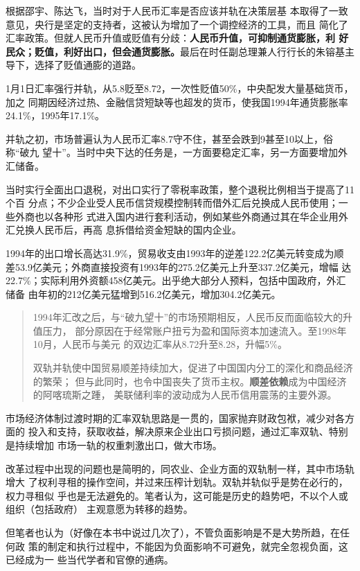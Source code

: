 根据邵宇、陈达飞\cite{huilv70binggui}，当时对于人民币汇率是否应该并轨在决策层基
本取得了一致意见，央行是坚定的支持者，这被认为增加了一个调控经济的工具，而且
简化了汇率政策。但就人民币升值或贬值有分歧：\textbf{人民币升值，可抑制通货膨胀，利
  好民众；贬值，利好出口，但会通货膨胀。}最后在时任副总理兼人行行长的朱镕基主
导下，选择了贬值通膨的道路。

1月1日汇率强行并轨，从5.8贬至8.72，一次性贬值50\%，中央配发大量基础货币，加之
同期因经济过热、金融信贷短缺等也超发的货币，使我国1994年通货膨胀率24.1\%，1995年17.1\%。

并轨之初，市场普遍认为人民币汇率8.7守不住，甚至会跌到9甚至10以上，俗称“破九
望十”。当时中央下达的任务是，一方面要稳定汇率，另一方面要增加外汇储备。

当时实行全面出口退税，对出口实行了零税率政策，整个退税比例相当于提高了11个百
分点；不少企业受人民币信贷规模控制转而借外汇后兑换成人民币使用；一些外商也以各种形
式进入国内进行套利活动，例如某些外商通过其在华企业用外汇兑换人民币后，再高
息拆借给资金短缺的国内企业。

1994年的出口增长高达31.9\%，贸易收支由1993年的逆差122.2亿美元转变成为顺
差53.9亿美元；外商直接投资有1993年的275.2亿美元上升至337.2亿美元，增幅
达22.7\%；实际利用外资额458亿美元。出乎绝大部分人预料，包括中国政府，外汇储备
由年初的212亿美元猛增到516.2亿美元，增加304.2亿美元。

\begin{quotation}
  1994年汇改之后，与“破九望十”的市场预期相反，人民币反而面临较大的升值压力，
  部分原因在于经常账户扭亏为盈和国际资本加速流入。至1998年10月，人民币与美元
  的双边汇率从8.72升至8.28，升幅5\%。\cite{huilv70binggui}

  双轨并轨使中国贸易顺差持续加大，促进了中国国内分工的深化和商品经济的繁荣；
  但与此同时，也令中国丧失了货币主权。\textbf{顺差依赖}成为中国经济的阿喀琉斯之踵，
  美联储利率的波动成为人民币信用震荡的主要外源。\cite{dajueqi}
\end{quotation}

市场经济体制过渡时期的汇率双轨思路是一贯的，国家抛弃财政包袱，减少对各方面的
投入和支持，获取收益，解决原来企业出口亏损问题，通过汇率双轨、特别是持续增加
市场一轨的权重刺激出口，做大市场。


改革过程中出现的问题也是简明的，同农业、企业方面的双轨制一样，其中市场轨增大
了权利寻租的操作空间，并过来压榨计划轨。双轨并轨似乎是势在必行的，权力寻租似
乎也是无法避免的。笔者认为，这可能是历史的趋势吧，不以个人或组织（包括政府）
主观意愿为转移的趋势。

但笔者也认为（好像在本书中说过几次了），不管负面影响是不是大势所趋，在任何政
策的制定和执行过程中，不能因为负面影响不可避免，就完全忽视负面，这已经成为一
些当代学者和官僚的通病。

